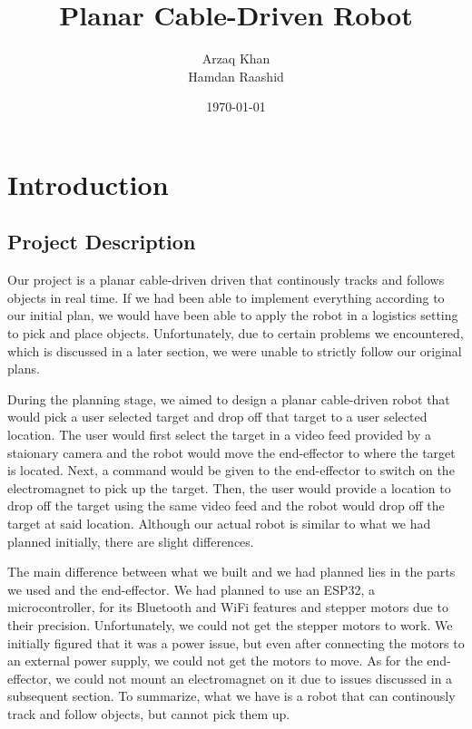 \documentclass[11pt]{article}
\title{Planar Cable-Driven Robot}
\author{Arzaq Khan \\
Hamdan Raashid \\
}
\date{\today}
\begin{document}
\maketitle

\section{Introduction}
\subsection{Project Description}
Our project is a planar cable-driven driven that continously tracks and follows objects in real time. If we had been able to
implement everything according to our initial plan, we would have been able to apply the robot in a logistics setting to pick and
place objects. Unfortunately, due to certain problems we encountered, which is discussed in a later section, we were unable to
strictly follow our original plans.

During the planning stage, we aimed to design a planar cable-driven robot that would pick a user selected target and drop off that
target to a user selected location. The user would first select the target in a video feed provided by a staionary camera and the
robot would move the end-effector to where the target is located. Next, a command would be given to the end-effector to switch on the
electromagnet to pick up the target. Then, the user would provide a location to drop off the target using
the same video feed and the robot would drop off the target at said location. 
Although our actual robot is similar to what we had planned initially, there are slight differences.

The main difference between what we built and we had planned lies in the parts we used and the end-effector. We had
planned to use an ESP32, a microcontroller, for its Bluetooth and WiFi features and stepper motors due to their precision.
Unfortunately, we could not get the stepper motors to work. We initially figured that it was a power issue, but even
after connecting the motors to an external power supply, we could not get the motors to move. As for the end-effector,
we could not mount an electromagnet on it due to issues discussed in a subsequent section. To summarize, what we have
is a robot that can continously track and follow objects, but cannot pick them up.
\end{document}
